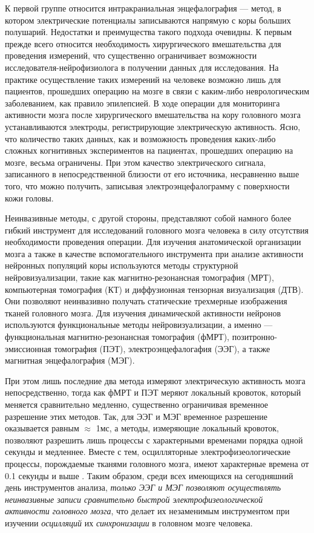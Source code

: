 К первой группе относится интракраниальная энцефалография --- метод,
в котором электрические потенциалы записываются напрямую с коры больших полушарий.
Недостатки и преимущества такого подхода очевидны. К первым прежде всего относится необходимость
хирургического вмешательства для проведения измерений, что существенно ограничивает возможности
исследователя-нейрофизиолога в получении данных для исследования.
На практике осуществление таких измерений на человеке возможно лишь для пациентов,
прошедших операцию на мозге в связи с каким-либо неврологическим заболеванием, как правило эпилепсией.
В ходе операции для мониторинга активности мозга после хирургического вмешательства на кору головного
мозга устанавливаются электроды, регистрирующие электрическую активность.
Ясно, что количество таких данных, как и  возможность проведения каких-либо сложных
когнитивных экспериментов на пациентах, прошедших операцию на мозге, весьма ограничены.
При этом качество электрического сигнала, записанного в непосредственной близости от его источника,
несравненно выше того, что можно получить, записывая электроэнцефалограмму с поверхности кожи головы.

Неинвазивные методы, с другой стороны, представляют собой намного более гибкий инструмент
для исследований головного мозга человека в силу отсутствия необходимости проведения операции.
Для изучения анатомической организации мозга а также в качестве вспомогательного инструмента
при анализе активности нейронных популяций коры используются методы структурной нейровизуализации,
такие как магнитно-резонансная томография (МРТ),
компьютерная томография (КТ) и диффузионная тензорная визуализация (ДТВ).
Они позволяют неинвазивно получать статические трехмерные изображения тканей головного мозга.
Для изучения динамической активности нейронов используются функциональные методы нейровизуализации,
а именно ---  функциональная магнитно-резонансная томография (фМРТ),
позитронно-эмиссионная томография (ПЭТ), электроэнцефалогафия (ЭЭГ), а также магнитная энцефалография (МЭГ).

При этом лишь последние два метода измеряют электрическую активность мозга непосредственно,
тогда как фМРТ и ПЭТ меряют локальный кровоток, который меняется сравнительно медленно,
существенно ограничивая временное разрешение этих методов.
Так, для ЭЭГ и МЭГ временное разрешение оказывается равным $\approx$ 1мс, а методы,
измеряющие локальный кровоток, позволяют разрешить лишь процессы с характерными временами 
порядка одной секунды и медленнее. Вместе с тем, осцилляторные электрофизеологические процессы, порождаемые
тканями головного мозга, имеют характерные времена от 0.1 секунды и выше .
Таким образом, среди всех имеющихся на сегодняшний день инструментов анализа, \emph{только ЭЭГ и МЭГ
позволяют осуществлять неинвазивные записи сравнительно быстрой электрофизеологической 
активности головного мозга}, что делает их незаменимым инструментом при изучении \emph{осцилляций} 
их \emph{синхронизации} в головном мозге человека. 


